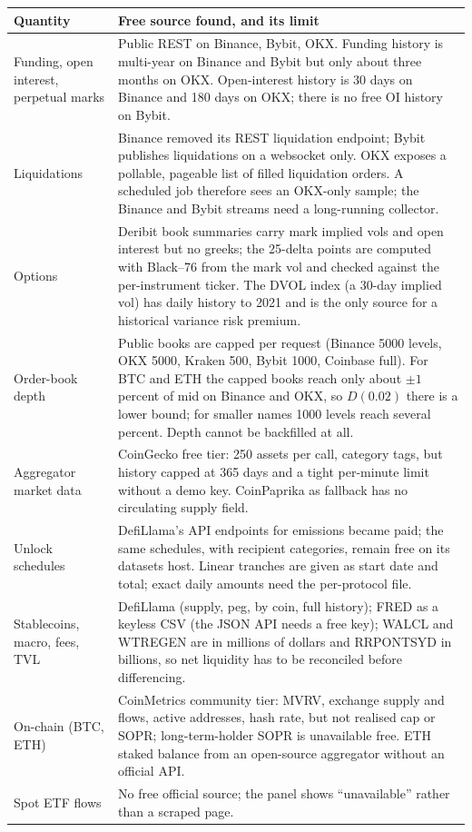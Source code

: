 \documentclass[11pt,a4paper]{article}
\theoremstyle{definition}
\begin{document}
\begin{center}
\small
\begin{tabular}{p{} p{}}
\toprule
Quantity & Free source found, and its limit \\
\midrule
Funding, open interest, perpetual marks & Public REST on Binance, Bybit, OKX. Funding history is multi-year on Binance and Bybit but only about three months on OKX. Open-interest history is 30 days on Binance and 180 days on OKX; there is no free OI history on Bybit. \\
Liquidations & Binance removed its REST liquidation endpoint; Bybit publishes liquidations on a websocket only. OKX exposes a pollable, pageable list of filled liquidation orders. A scheduled job therefore sees an OKX-only sample; the Binance and Bybit streams need a long-running collector. \\
Options & Deribit book summaries carry mark implied vols and open interest but no greeks; the 25-delta points are computed with Black--76 from the mark vol and checked against the per-instrument ticker. The DVOL index (a 30-day implied vol) has daily history to 2021 and is the only source for a historical variance risk premium. \\
Order-book depth & Public books are capped per request (Binance 5000 levels, OKX 5000, Kraken 500, Bybit 1000, Coinbase full). For BTC and ETH the capped books reach only about $\pm 1$ percent of mid on Binance and OKX, so $D(0.02)$ there is a lower bound; for smaller names 1000 levels reach several percent. Depth cannot be backfilled at all. \\
Aggregator market data & CoinGecko free tier: 250 assets per call, category tags, but history capped at 365 days and a tight per-minute limit without a demo key. CoinPaprika as fallback has no circulating supply field. \\
Unlock schedules & DefiLlama's API endpoints for emissions became paid; the same schedules, with recipient categories, remain free on its datasets host. Linear tranches are given as start date and total; exact daily amounts need the per-protocol file. \\
Stablecoins, macro, fees, TVL & DefiLlama (supply, peg, by coin, full history); FRED as a keyless CSV (the JSON API needs a free key); WALCL and WTREGEN are in millions of dollars and RRPONTSYD in billions, so net liquidity has to be reconciled before differencing. \\
On-chain (BTC, ETH) & CoinMetrics community tier: MVRV, exchange supply and flows, active addresses, hash rate, but not realised cap or SOPR; long-term-holder SOPR is unavailable free. ETH staked balance from an open-source aggregator without an official API. \\
Spot ETF flows & No free official source; the panel shows ``unavailable'' rather than a scraped page. \\
\bottomrule
\end{tabular}
\end{center}
\end{document}
